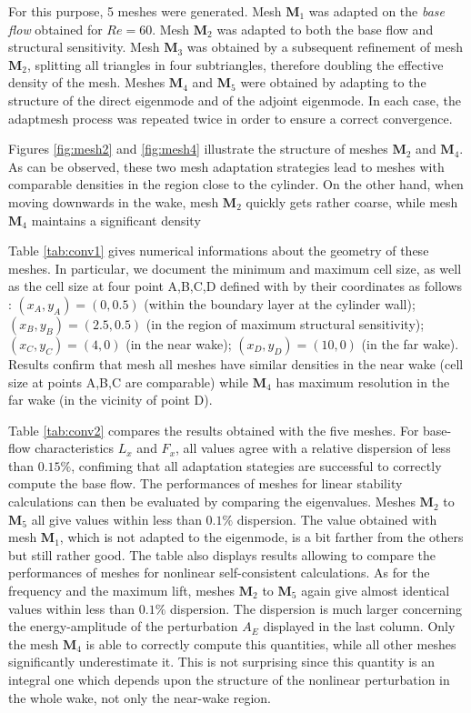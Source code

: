 \documentclass[twocolumn,10pt]{asme2ej}
\begin{document}
For this purpose, 5 meshes were generated. 
Mesh $\mathbf{M}_1$ was adapted on the {\em base flow} obtained for $Re=60$.
Mesh $\mathbf{M}_2$ was adapted to both the base flow and structural sensitivity.
Mesh $\mathbf{M}_3$ was obtained by a subsequent refinement of mesh $\mathbf{M}_2$, splitting all triangles in four subtriangles, therefore doubling the effective density of the mesh.
Meshes $\mathbf{M}_4$ and $\mathbf{M}_5$ were obtained by adapting to the structure of the direct eigenmode and of the adjoint eigenmode.
In each case, the adaptmesh process was repeated twice in order to ensure a correct convergence.

Figures \ref{fig:mesh2} and \ref{fig:mesh4} illustrate the structure of meshes $\mathbf{M}_2$ and $\mathbf{M}_4$. As can be observed, these two mesh adaptation strategies lead to meshes with comparable densities in the region close to the cylinder. On the other hand, when moving downwards in the wake, mesh $\mathbf{M}_2$ quickly gets rather coarse, while mesh $\mathbf{M}_4$ maintains a significant density  

Table \ref{tab:conv1} gives numerical informations about the geometry of these meshes. In particular, we document the minimum and maximum cell size, as well as the cell size at four point A,B,C,D defined with by their coordinates as follows : $(x_A,y_A) = (0,0.5)$ (within the boundary layer at the cylinder wall); $(x_B,y_B) = (2.5,0.5)$ (in the region of maximum structural sensitivity); $(x_C,y_C) = (4,0)$ (in the near wake); $(x_D,y_D) = (10,0)$ (in the far wake). Results confirm that mesh all meshes have similar densities in the near wake (cell size at points A,B,C are comparable) 
while $\mathbf{M}_4$ has maximum resolution in the far wake (in the vicinity of point D).

Table  \ref{tab:conv2} compares the results obtained with the five meshes. For base-flow characteristics $L_x$ and $F_x$, all values agree with a relative dispersion of less than $0.15\%$, confiming that all adaptation stategies are successful to correctly compute the base flow. 
The performances of meshes for linear stability calculations can then be evaluated by comparing the eigenvalues. Meshes $\mathbf{M}_2$ to $\mathbf{M}_5$ all give values within less than $0.1\%$ dispersion. The value obtained with mesh  $\mathbf{M}_1$, which is not adapted to the eigenmode, is a bit farther from the others but still rather good. The table also displays results allowing to compare the performances of meshes for nonlinear self-consistent calculations. As for the frequency and the maximum lift, meshes $\mathbf{M}_2$ to $\mathbf{M}_5$ again give almost identical values within less than $0.1\%$ dispersion. The dispersion is much larger concerning the energy-amplitude of the perturbation $A_E$ displayed in the last column. Only the mesh $\mathbf{M}_4$ is able to correctly compute this quantities, while all other meshes significantly underestimate it. This is not surprising since this quantity is an integral one which depends upon the structure of the nonlinear perturbation in the whole wake, not only the near-wake region.
\end{document}
